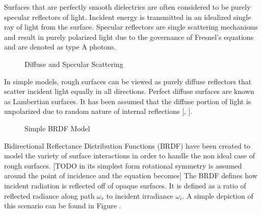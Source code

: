 Surfaces that are perfectly smooth dielectrics are often considered to be purely specular reflectors of light.  Incident energy is transmitted in an idealized single ray of light from the surface.  Specular reflectors are single scattering mechanisms and result in purely polarized light due to the governance of Fresnel’s equations and are denoted as type A photons.
%
\begin{figure}
    \begin{center}
    \end{center}
    \caption{Diffuse and Specular Scattering}
    \label{fig:scattering}
\end{figure}
%
In simple models, rough surfaces can be viewed as purely diffuse reflectors that scatter incident light equally in all directions.  Perfect diffuse surfaces are known as Lambertian surfaces.  It has been assumed that the diffuse portion of light is unpolarized due to random nature of internal reflections [\cite{specularclass}, \cite{grant}].
\begin{figure}
    \begin{center}
    \end{center}
    \caption{Simple BRDF Model}
    \label{fig:scattering}
\end{figure}
Bidirectional Reflectance Distribution Functions (BRDF) have been created to model the variety of surface interactions in order to handle the non ideal case of rough surfaces. [TODO in its simplest form rotational symmetry is assumed around the point of incidence and the equation becomes]
The BRDF defines how incident radiation is reflected off of opaque surfaces.  It is defined as a ratio of reflected radiance along path $\omega_r$ to incident irradiance $\omega_i$. A simple depiction of this scenario can be found in Figure .

